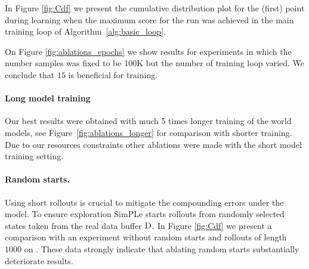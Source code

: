 In Figure \ref{fig:Cdf} we present the cumulative distribution plot for the (first) point during learning when the maximum score for the run was achieved in the main training loop of Algorithm~\ref{alg:basic_loop}. 

On Figure \ref{fig:ablations_epochs} we show results for experiments in which the number samples was fixed to be 100K but the number of training loop varied. We conclude that $15$ is beneficial for training.


\paragraph{Long model training} Our best results were obtained with much 5 times longer training of the world models, see Figure~\ref{fig:ablations_longer} for comparison with shorter training. Due to our resources constraints other ablations were made with the short model training setting.

\paragraph{Random starts.} Using short rollouts is crucial to mitigate the compounding errors under the model. To ensure exploration SimPLe starts rollouts from randomly selected states taken from the real data buffer $\textsc{D}$. In Figure \ref{fig:Cdf} we present a comparison with an experiment without random starts and rollouts of length $1000$ on \seaquest. These data strongly indicate that ablating random starts substantially deteriorate results.  


